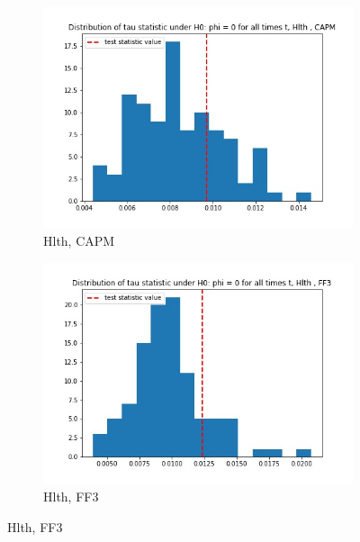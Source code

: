 \documentclass{article}
\begin{document}
  \begin{figure}
  \centering
  \begin{subfigure}[b]{0.3\textwidth}
    \centering
    \includegraphics[width=\textwidth]{Hlth/tau_hist_02_CAPM.jpg}
    \caption{Hlth, CAPM}
    \label{fig:1}
  \end{subfigure}
  \begin{subfigure}[b]{0.3\textwidth}
    \centering
    \includegraphics[width=\textwidth]{Hlth/tau_hist_02_FF3.jpg}
    \caption{Hlth, FF3}
    \label{fig:2}
  \end{subfigure}
  \end{figure}
  
  
\end{document}
